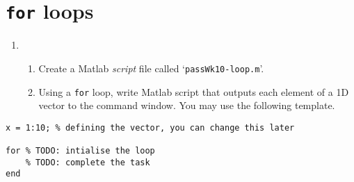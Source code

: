 \documentclass{pass}
\begin{document}
\section*{\texttt{for} loops}
\begin{enumerate}[resume]
\item
	\begin{enumerate}
	\item Create a Matlab \textit{script} file called `\texttt{passWk10-loop.m}'.\\
	
	\item Using a \texttt{for} loop, write Matlab script that outputs each element of a 1D vector to the command window. You may use the following template.
	\end{enumerate}
\end{enumerate}
\begin{lstlisting}[style=Matlab]
x = 1:10; % defining the vector, you can change this later

for % TODO: intialise the loop
	% TODO: complete the task
end
\end{lstlisting}
\end{document}
